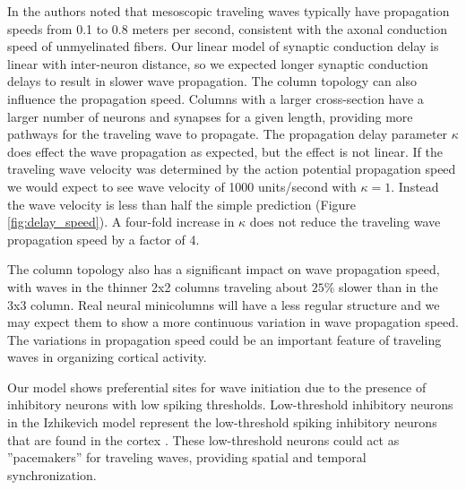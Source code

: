 \documentclass[a4paper,11pt]{article}
\begin{document}
In \cite{muller2018} the authors noted that mesoscopic traveling waves typically have propagation speeds from 0.1 to 0.8 meters per second, consistent with the axonal conduction speed of unmyelinated fibers.
Our linear model of synaptic conduction delay is linear with inter-neuron distance, so we expected longer synaptic conduction delays to result in slower wave propagation.
The column topology can also influence the propagation speed.
Columns with a larger cross-section have a larger number of neurons and synapses for a given length, providing more pathways for the traveling wave to propagate.
The propagation delay parameter $\kappa$ does effect the wave propagation as expected, but the effect is not linear.
If the traveling wave velocity was determined by the action potential propagation speed we would expect to see wave velocity of 1000 units/second with $\kappa=1$.
Instead the wave velocity is less than half the simple prediction (Figure \ref{fig:delay_speed}).
A four-fold increase in $\kappa$ does not reduce the traveling wave propagation speed by a factor of 4. 

The column topology also has a significant impact on wave propagation speed, with waves in the thinner 2x2 columns traveling about $25\%$ slower than in the 3x3 column.
Real neural minicolumns will have a less regular structure and we may expect them to show a more continuous variation in wave propagation speed. 
The variations in propagation speed could be an important feature of traveling waves in organizing cortical activity.

Our model shows preferential sites for wave initiation due to the presence of inhibitory neurons with low spiking thresholds.
Low-threshold inhibitory neurons in the Izhikevich model represent the low-threshold spiking inhibitory neurons that are found in the cortex \cite{izhikevich2003}\cite{gibson2009}.
These low-threshold neurons could act as ''pacemakers'' for traveling waves, providing spatial and temporal synchronization.

\clearpage
\printbibliography
\end{document}
